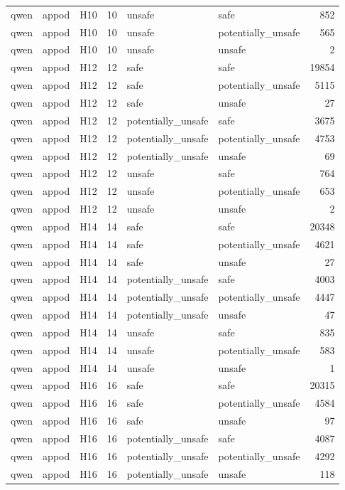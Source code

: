 \begin{table}[tbp]
\begin{tabular}{lllrllr}
qwen & appod & H10 & 10 & unsafe & safe & 852 \\
qwen & appod & H10 & 10 & unsafe & potentially\_unsafe & 565 \\
qwen & appod & H10 & 10 & unsafe & unsafe & 2 \\
qwen & appod & H12 & 12 & safe & safe & 19854 \\
qwen & appod & H12 & 12 & safe & potentially\_unsafe & 5115 \\
qwen & appod & H12 & 12 & safe & unsafe & 27 \\
qwen & appod & H12 & 12 & potentially\_unsafe & safe & 3675 \\
qwen & appod & H12 & 12 & potentially\_unsafe & potentially\_unsafe & 4753 \\
qwen & appod & H12 & 12 & potentially\_unsafe & unsafe & 69 \\
qwen & appod & H12 & 12 & unsafe & safe & 764 \\
qwen & appod & H12 & 12 & unsafe & potentially\_unsafe & 653 \\
qwen & appod & H12 & 12 & unsafe & unsafe & 2 \\
qwen & appod & H14 & 14 & safe & safe & 20348 \\
qwen & appod & H14 & 14 & safe & potentially\_unsafe & 4621 \\
qwen & appod & H14 & 14 & safe & unsafe & 27 \\
qwen & appod & H14 & 14 & potentially\_unsafe & safe & 4003 \\
qwen & appod & H14 & 14 & potentially\_unsafe & potentially\_unsafe & 4447 \\
qwen & appod & H14 & 14 & potentially\_unsafe & unsafe & 47 \\
qwen & appod & H14 & 14 & unsafe & safe & 835 \\
qwen & appod & H14 & 14 & unsafe & potentially\_unsafe & 583 \\
qwen & appod & H14 & 14 & unsafe & unsafe & 1 \\
qwen & appod & H16 & 16 & safe & safe & 20315 \\
qwen & appod & H16 & 16 & safe & potentially\_unsafe & 4584 \\
qwen & appod & H16 & 16 & safe & unsafe & 97 \\
qwen & appod & H16 & 16 & potentially\_unsafe & safe & 4087 \\
qwen & appod & H16 & 16 & potentially\_unsafe & potentially\_unsafe & 4292 \\
qwen & appod & H16 & 16 & potentially\_unsafe & unsafe & 118 \\

\end{tabular}
\end{table}
